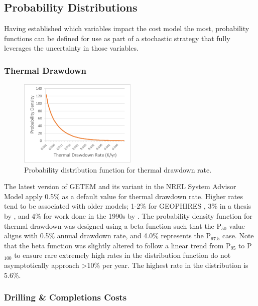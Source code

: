 \subsection{Probability Distributions}

Having established which variables impact the cost model the most, probability functions can be defined for use as part of a stochastic strategy that fully leverages the uncertainty in those variables.  

\subsubsection{Thermal Drawdown}
\label{cm4:prob_tdr}

\begin{figure}
\centering
\includegraphics[width=0.5\textwidth]{templates/images/Figure-ProbDist-ThermalDrawdown.png}
\singlespacing
\caption[PDF for thermal drawdown rate]{Probability distribution function for thermal drawdown rate.}
\label{fig:pd_drawdown}
\end{figure}

The latest version of GETEM \citep{mines_getem_2016} and its variant in the NREL System Advisor Model \citep{freeman_system_2018} apply 0.5\% as a default value for thermal drawdown rate. Higher rates tend to be associated with older models; 1-2\% for GEOPHIRES \citep{beckers_low-temperature_2016}, 3\% in a thesis by \citet{augustine_hydrothermal_2009}, and 4\% for work done in the 1990s by \citet{tester_economic_1990}. The probability density function for thermal drawdown was designed using a beta function such that the P$_{50}$ value aligns with 0.5\% annual drawdown rate, and 4.0\% represents the P$_{97.5}$ case. Note that the beta function was slightly altered to follow a linear trend from P$_{95}$ to P$_{100}$ to ensure rare extremely high rates in the distribution function do not asymptotically approach >10\% per year. The highest rate in the distribution is 5.6\%.

\subsubsection{Drilling \& Completions Costs}
\label{cm4:prob_dc}


